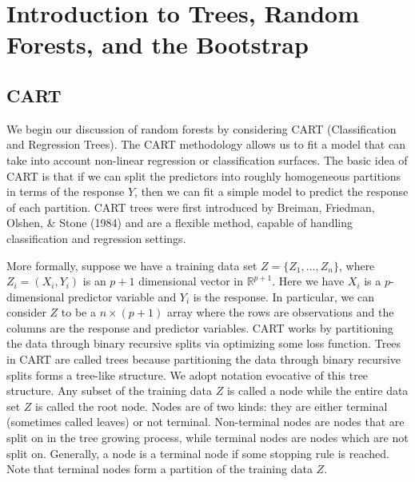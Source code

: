 \documentclass[12pt,twoside]{reedthesis}
\theoremstyle{definition}
\theoremstyle{definition}
\theoremstyle{definition}
\theoremstyle{remark}
\begin{document}
\chapter{Introduction to Trees, Random Forests, and the
Bootstrap}\label{rmd-basics}

\section{CART}\label{cart}

We begin our discussion of random forests by considering CART
(Classification and Regression Trees). The CART methodology allows us to
fit a model that can take into account non-linear regression or
classification surfaces. The basic idea of CART is that if we can split
the predictors into roughly homogeneous partitions in terms of the
response \(Y\), then we can fit a simple model to predict the response
of each partition. CART trees were first introduced by Breiman,
Friedman, Olshen, \& Stone (1984) and are a flexible method, capable of
handling classification and regression settings. \par

More formally, suppose we have a training data set
\(Z=\{Z_1,\ldots,Z_n\}\), where \(Z_i=(X_i,Y_i)\) is an \(p+1\)
dimensional vector in \(\mathbb{R}^{p+1}\). Here we have \(X_i\) is a
\(p\)-dimensional predictor variable and \(Y_i\) is the response. In
particular, we can consider \(Z\) to be a \(n\times (p+1)\) array where
the rows are observations and the columns are the response and predictor
variables. CART works by partitioning the data through binary recursive
splits via optimizing some loss function. Trees in CART are called trees
because partitioning the data through binary recursive splits forms a
tree-like structure. We adopt notation evocative of this tree structure.
Any subset of the training data \(Z\) is called a node while the entire
data set \(Z\) is called the root node. Nodes are of two kinds: they are
either terminal (sometimes called leaves) or not terminal. Non-terminal
nodes are nodes that are split on in the tree growing process, while
terminal nodes are nodes which are not split on. Generally, a node is a
terminal node if some stopping rule is reached. Note that terminal nodes
form a partition of the training data \(Z\). \par
\end{document}
